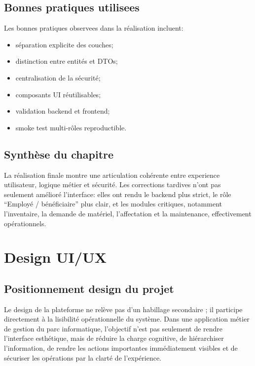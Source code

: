 ﻿\documentclass[12pt,a4paper,oneside]{report}
\begin{document}
\section{Bonnes pratiques utilisees}
Les bonnes pratiques observees dans la réalisation incluent:
\begin{itemize}
  \item séparation explicite des couches;
  \item distinction entre entités et DTOs;
  \item centralisation de la sécurité;
  \item composants UI réutilisables;
  \item validation backend et frontend;
  \item smoke test multi-rôles reproductible.
\end{itemize}

\section{Synthèse du chapitre}
La réalisation finale montre une articulation cohérente entre experience utilisateur, logique métier et sécurité. Les corrections tardives n'ont pas seulement amélioré l'interface: elles ont rendu le backend plus strict, le rôle \enquote{Employé / bénéficiaire} plus clair, et les modules critiques, notamment l'inventaire, la demande de matériel, l'affectation et la maintenance, effectivement opérationnels.









\chapter{Design UI/UX}
\label{chap:uiux}

\section{Positionnement design du projet}
Le design de la plateforme ne relève pas d'un habillage secondaire ; il participe directement à la lisibilité opérationnelle du système. Dans une application métier de gestion du parc informatique, l'objectif n'est pas seulement de rendre l'interface esthétique, mais de réduire la charge cognitive, de hiérarchiser l'information, de rendre les actions importantes immédiatement visibles et de sécuriser les opérations par la clarté de l'expérience.
\end{document}
